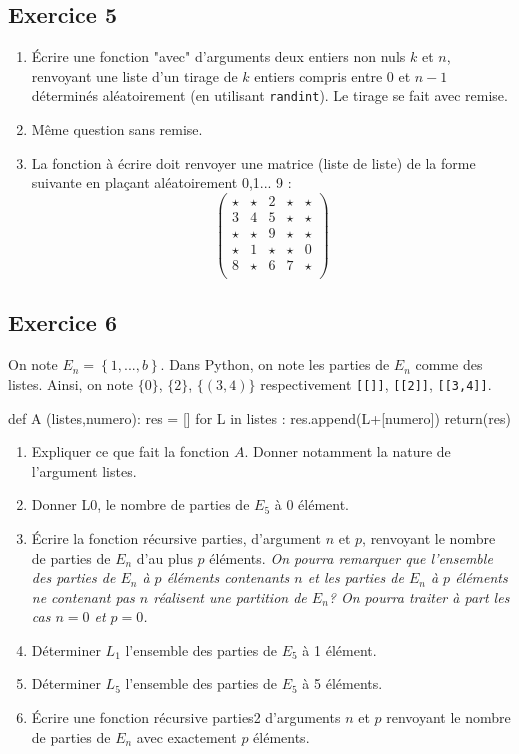 \documentclass[10pt,fleqn]{article} %
\begin{document}
\begin{multicols}{2}
\subsection*{Exercice 5}
\begin{enumerate}
\item Écrire une fonction "avec" d'arguments deux entiers non nuls $k$ et $n$, renvoyant une liste d'un tirage de $k$ entiers compris entre $0$ et $n-1$ déterminés aléatoirement (en utilisant \texttt{randint}). Le tirage se fait avec remise.
\item Même question sans remise.
\item La fonction à écrire doit renvoyer une matrice (liste de liste) de la forme suivante en plaçant aléatoirement 0,1... 9 :
$$
\begin{pmatrix}
\star & \star & 2& \star & \star \\
3 & 4 & 5 & \star & \star \\
\star & \star & 9 & \star & \star \\
\star & 1 & \star & \star & 0 \\
8 & \star & 6 & 7 & \star \\
\end{pmatrix}
$$
\end{enumerate}

\subsection*{Exercice 6}
On note $E_n=\left\{1,...,b\right\}$. Dans Python, on note les parties de $E_n$ comme des listes. Ainsi, on note $\{0 \}$, $\{ 2\}$, $\{(3,4) \}$ respectivement \texttt{[[]]}, \texttt{[[2]]}, \texttt{[[3,4]]}.   

\begin{python}
def A (listes,numero):
    res = []
    for L in listes :
        res.append(L+[numero])
    return(res)
\end{python}
\begin{enumerate}
\item Expliquer ce que fait la fonction $A$. Donner notamment la nature de l'argument listes. 
\item Donner L0, le nombre de parties de $E_5$ à 0 élément.
\item Écrire la fonction récursive parties, d'argument $n$ et $p$, renvoyant le nombre de parties de $E_n$ d'au plus $p$ éléments.  \textit{On pourra remarquer que l'ensemble des parties de $E_n$ à $p$ éléments contenants $n$ et les parties de $E_n$ à $p$ éléments ne contenant pas $n$ réalisent une partition de $E_n$? On pourra traiter à part les cas $n=0$ et $p=0$.}
\item Déterminer $L_1$ l'ensemble des parties de $E_5$ à 1 élément.
\item Déterminer $L_5$ l'ensemble des parties de $E_5$ à 5 éléments.
\item Écrire une fonction récursive parties2 d'arguments $n$ et $p$ renvoyant le nombre de parties de $E_n$ avec exactement $p$ éléments.
\end{enumerate}


\end{multicols}
\end{document}
